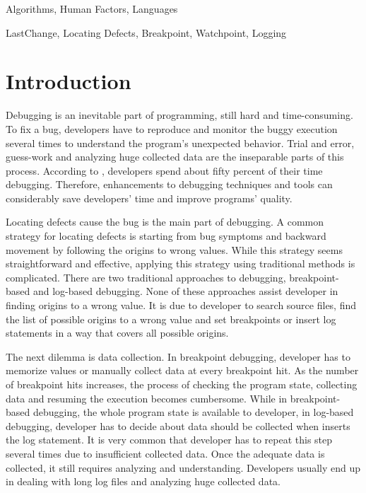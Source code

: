 \documentclass[preprint]{sigplanconf}
\begin{document}

\terms
Algorithms, Human Factors, Languages

\keywords
LastChange, Locating Defects, Breakpoint, Watchpoint, Logging

\section{Introduction}
Debugging is an inevitable part of programming, still hard and time-consuming. To fix a bug, developers have to reproduce and monitor the buggy execution several times to understand the program's unexpected behavior. Trial and error, guess-work and analyzing huge collected data are the inseparable parts of this process. According to \cite{LaToza}, developers spend about fifty percent of their time debugging. Therefore, enhancements to debugging techniques and tools can considerably save developers' time and improve programs' quality.

Locating defects cause the bug is the main part of debugging. A common strategy for locating defects is starting from bug symptoms and backward movement by following the origins to wrong values. While this strategy seems straightforward and effective, applying this strategy using traditional methods is complicated. There are two traditional approaches to debugging, breakpoint-based and log-based debugging. None of these approaches assist developer in finding origins to a wrong value. It is due to developer to search source files, find the list of possible origins to a wrong value and set breakpoints or insert log statements in a way that covers all possible origins.

The next dilemma is data collection. In breakpoint debugging, developer has to memorize values or manually collect data at every breakpoint hit. As the number of breakpoint hits increases, the process of checking the program state, collecting data and resuming the execution becomes cumbersome. While in breakpoint-based debugging, the whole program state is available to developer, in log-based debugging, developer has to decide about data should be collected when inserts the log statement. It is very common that developer has to repeat this step several times due to insufficient collected data. Once the adequate data is collected, it still requires analyzing and understanding. Developers usually end up in dealing with long log files and analyzing huge collected data.
\end{document}
